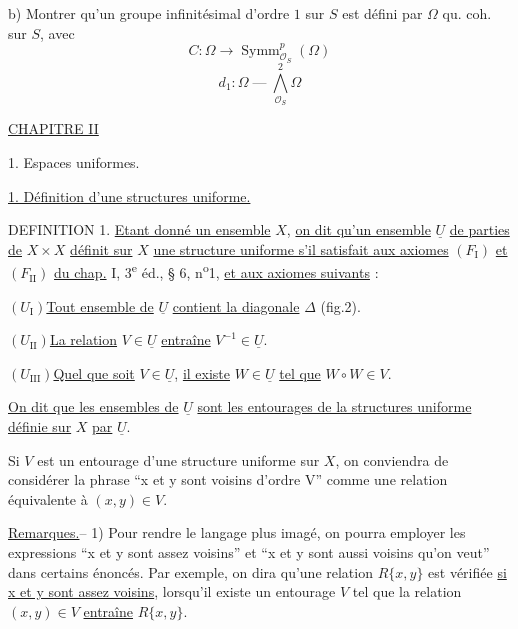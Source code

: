 b) Montrer qu'un groupe infinitésimal d'ordre $1$ sur $S$
est défini par $\Omega$ qu. coh. sur $S$, avec
\[
C:\Omega\longrightarrow\operatorname{Symm}_{\mathcal O_S}^p(\Omega)
\]
\[
d_1:\Omega\mathbin{\text{---}}\bigwedge_{\mathcal O_S}^2\Omega
\]

\uline{CHAPITRE II}


1. Espaces uniformes.

\uline{1. Définition d'une structures uniforme.}

DEFINITION 1. \uline{Etant donné un ensemble} $X$, \uline{on dit qu'un ensemble} $\underline U$ \uline{de parties de}
$X\times X$ \uline{définit sur} $X$ \uline{une structure uniforme s'il satisfait aux axiomes}
$(F_{\mathrm I})$ \uline{et} $(F_{\mathrm{II}})$ \uline{du chap.} I, 3\textsuperscript{e} éd., § 6, n\textsuperscript{o}1, \uline{et aux axiomes suivants} :

$(U_{\mathrm I})$\quad \uline{Tout ensemble de} $\underline U$ \uline{contient la diagonale} $\Delta$ (fig.2).

$(U_{\mathrm{II}})$\quad \uline{La relation} $V\in\underline U$ \uline{entraîne} $V^{-1}\in\underline U$.

$(U_{\mathrm{III}})$\quad \uline{Quel que soit} $V\in\underline U$, \uline{il existe} $W\in\underline U$ \uline{tel que} $W\circ W\in V$.

\uline{On dit que les ensembles de} $\underline U$ \uline{sont les entourages de la structures uniforme définie sur} $X$ \uline{par} $\underline U$.

Si $V$ est un entourage d'une structure uniforme sur $X$, on conviendra de
considérer la phrase ``x et y sont voisins d'ordre V'' comme une relation équivalente à $(x,y)\in V$.

\uline{Remarques.}-- 1) Pour rendre le langage plus imagé, on pourra employer
les expressions ``x et y sont assez voisins'' et ``x et y sont aussi
voisins qu'on veut'' dans certains énoncés. Par exemple, on dira
qu'une relation $R\{x,y\}$ est vérifiée \uline{si x et y sont assez voisins},
lorsqu'il existe un entourage $V$ tel que la relation $(x,y)\in V$ \uline{entraîne} $R\{x,y\}$.

